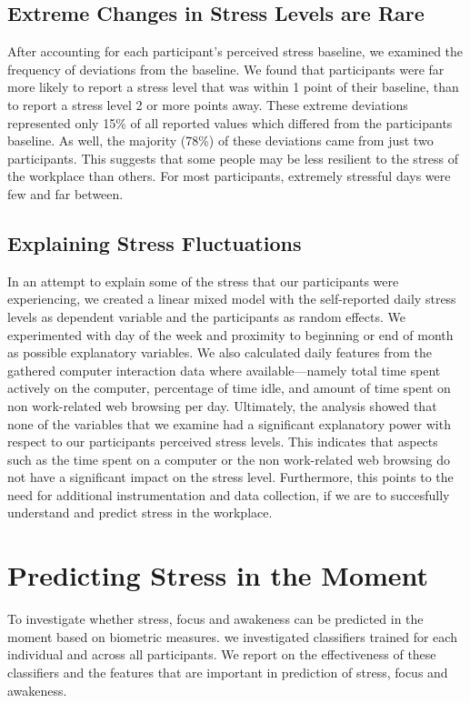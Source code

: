 \subsection{Extreme Changes in Stress Levels are Rare}
After accounting for each participant's perceived stress baseline, we
examined the frequency of deviations from the baseline. We found that
participants were far more likely to report a stress level that was
within 1 point of their baseline, than to report a stress level 2 or
more points away. These extreme deviations represented only 15\% of
all reported values which differed from the participants baseline. As
well, the majority (78\%) of these deviations came from just two
participants. This suggests that some people may be less resilient to
the stress of the workplace than others. For most participants,
extremely stressful days were few and far between.

\subsection{Explaining Stress Fluctuations}
In an attempt to explain some of the stress that our participants were experiencing, we created a linear mixed model with the self-reported daily stress levels as dependent variable and the participants as random effects. We experimented with day of the week and proximity to beginning or end of month as possible explanatory variables. We also calculated daily features from the gathered computer interaction data where available---namely total time spent actively on the computer, percentage of time idle, and amount of time spent on non work-related web browsing per day. Ultimately, the analysis showed that none of the variables that we examine had a significant explanatory power with respect to our participants perceived stress levels. This indicates that aspects such as the time spent on a computer or the non work-related web browsing do not have a significant impact on the stress level. Furthermore, this points to the need for additional instrumentation and data collection, if we are to succesfully understand and predict stress in the workplace.


\section{Predicting Stress in the Moment}
\label{secOverallAccuracy}

To investigate whether stress, focus and awakeness can be predicted in
the moment based on biometric measures.
we investigated classifiers trained
for each individual and across all participants. We report on the effectiveness of
these classifiers and the features that are important in prediction of stress, focus
and awakeness.

